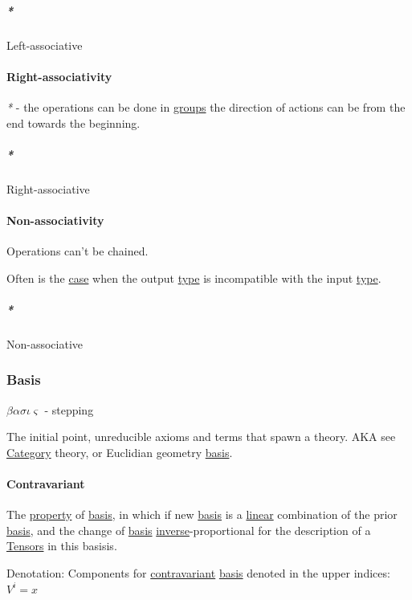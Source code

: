 \documentclass[a4paper,14pt,oneside]{book}
\begin{document}
\subparagraph{\emph{*}}
\label{sec:org8ce5e05}

\label{org85fcba2}Left-associative

\paragraph{\label{orgb729ac9}Right-associativity}
\label{sec:org4d7e7f5}
\emph{*} - the operations can be done in \hyperref[org8052e93]{groups} the direction of actions can be from the end towards the beginning.

\subparagraph{\emph{*}}
\label{sec:orgbf1dcfe}

\label{org6c17829}Right-associative

\paragraph{\label{org2b19689}Non-associativity}
\label{sec:org1b1d84c}
Operations can't be chained.

Often is the \hyperref[org1e8f745]{case} when the output \hyperref[orgef9e87b]{type} is incompatible with the input \hyperref[orgef9e87b]{type}.

\subparagraph{\emph{*}}
\label{sec:orgba1daf0}

\label{org55838a5}Non-associative

\subsubsection{\label{orgb1ea5cb}Basis}
\label{sec:org472ed27}
\(\beta\alpha\sigma\iota\varsigma\) - stepping

The initial point, unreducible axioms and terms that spawn a theory.
AKA see \hyperref[orga938d56]{Category} theory, or Euclidian geometry \hyperref[orgb1ea5cb]{basis}.

\paragraph{\label{orgc9b46c4}Contravariant}
\label{sec:orgb91fb85}
The \hyperref[org638ba9c]{property} of \hyperref[orgb1ea5cb]{basis}, in which if new \hyperref[orgb1ea5cb]{basis} is a \hyperref[orge56c9c3]{linear} combination of the prior \hyperref[orgb1ea5cb]{basis}, and the change of \hyperref[orgb1ea5cb]{basis} \hyperref[orgc71f837]{inverse}-proportional for the description of a \hyperref[org5dc4a17]{Tensors} in this basisis.

Denotation:
Components for \hyperref[orgc9b46c4]{contravariant} \hyperref[orgb1ea5cb]{basis} denoted in the upper indices:
\(V^{i} = x\)
\end{document}
